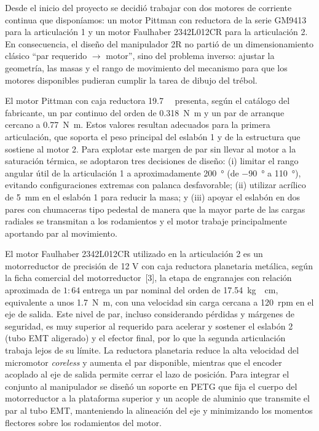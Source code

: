 \documentclass[11pt,a4paper]{article}
\begin{document}
Desde el inicio del proyecto se decidió trabajar con dos motores de corriente continua que disponíamos: un motor Pittman con reductora de la serie GM9413 para la articulación 1 y un motor Faulhaber 2342L012CR para la articulación 2. En consecuencia, el diseño del manipulador 2R no partió de un dimensionamiento clásico ``par requerido $\rightarrow$ motor'', sino del problema inverso: ajustar la geometría, las masas y el rango de movimiento del mecanismo para que los motores disponibles pudieran cumplir la tarea de dibujo del trébol.

El motor Pittman con caja reductora \SI{19.7}{\colon{}} presenta, según el catálogo del fabricante, un par continuo del orden de \SI{0.318}{\newton\metre} y un par de arranque cercano a \SI{0.77}{\newton\metre}. Estos valores resultan adecuados para la primera articulación, que soporta el peso principal del eslabón 1 y de la estructura que sostiene al motor 2. Para explotar este margen de par sin llevar al motor a la saturación térmica, se adoptaron tres decisiones de diseño: (i) limitar el rango angular útil de la articulación 1 a aproximadamente \SI{200}{\degree} (de \SI{-90}{\degree} a \SI{110}{\degree}), evitando configuraciones extremas con palanca desfavorable; (ii) utilizar acrílico de \SI{5}{\milli\metre} en el eslabón 1 para reducir la masa; y (iii) apoyar el eslabón en dos pares con chumaceras tipo pedestal de manera que la mayor parte de las cargas radiales se transmitan a los rodamientos y el motor trabaje principalmente aportando par al movimiento.

El motor Faulhaber 2342L012CR utilizado en la articulación 2 es un motorreductor de precisión de 12 V con caja reductora planetaria metálica, según la ficha comercial del motorreductor~[3], la etapa de engranajes con relación aproximada de $1\!:\!64$ entrega un par nominal del orden de \SI{17.54}{kg\cdot cm}, equivalente a unos \SI{1.7}{\newton\metre}, con una velocidad sin carga cercana a \SI{120}{rpm} en el eje de salida. Este nivel de par, incluso considerando pérdidas y márgenes de seguridad, es muy superior al requerido para acelerar y sostener el eslabón 2 (tubo EMT aligerado) y el efector final, por lo que la segunda articulación trabaja lejos de su límite. La reductora planetaria reduce la alta velocidad del micromotor \emph{coreless} y aumenta el par disponible, mientras que el encoder acoplado al eje de salida permite cerrar el lazo de posición. Para integrar el conjunto al manipulador se diseñó un soporte en PETG que fija el cuerpo del motorreductor a la plataforma superior y un acople de aluminio que transmite el par al tubo EMT, manteniendo la alineación del eje y minimizando los momentos flectores sobre los rodamientos del motor.
\end{document}
